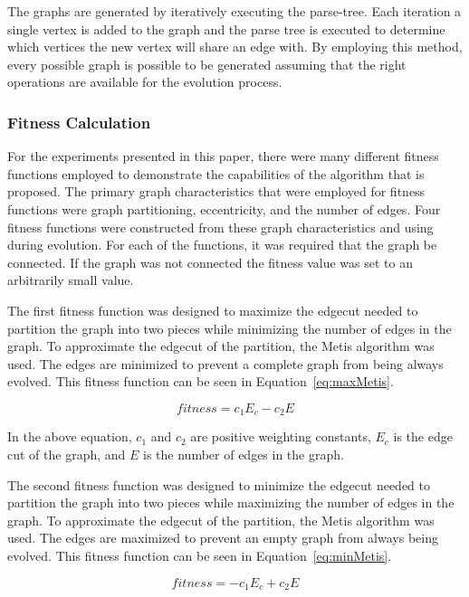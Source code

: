 \documentclass{article}
\begin{document}
The graphs are generated by iteratively executing the parse-tree. Each iteration a single vertex is added to the graph and the parse tree is executed to determine
which vertices the new vertex will share an edge with. By employing this method, every possible graph is possible to be generated assuming that the right operations 
are available for the evolution process. 

\subsubsection{Fitness Calculation}
For the experiments presented in this paper, there were many different fitness functions employed to demonstrate the capabilities of the algorithm that
is proposed. The primary graph characteristics that were employed for fitness functions were graph partitioning, eccentricity, and the number of edges.  
Four fitness functions were constructed from these graph characteristics and using during evolution. For each of the functions, it was required that the graph
be connected. If the graph was not connected the fitness value was set to an arbitrarily small value.

The first fitness function was designed to maximize 
the edgecut needed to partition the graph into two pieces while minimizing the number of edges in the graph. To approximate the edgecut of the partition,
the Metis algorithm was used. The edges are minimized to prevent a complete graph from being always evolved. This fitness function can be seen in Equation~\ref{eq:maxMetis}.

\begin{equation}
\label{eq:maxMetis}
fitness = c_1E_c - c_2E
\end{equation}

In the above equation, $c_1$ and $c_2$ are positive weighting constants, $E_c$ is the edge cut of the graph, and $E$ is the number of edges in the graph.


The second fitness function was designed to minimize 
the edgecut needed to partition the graph into two pieces while maximizing the number of edges in the graph. To approximate the edgecut of the partition,
the Metis algorithm was used. The edges are maximized to prevent an empty graph from always being evolved. This fitness function can be seen in Equation~\ref{eq:minMetis}.

\begin{equation}
\label{eq:minMetis}
fitness = -c_1E_c + c_2E
\end{equation}
\end{document}
